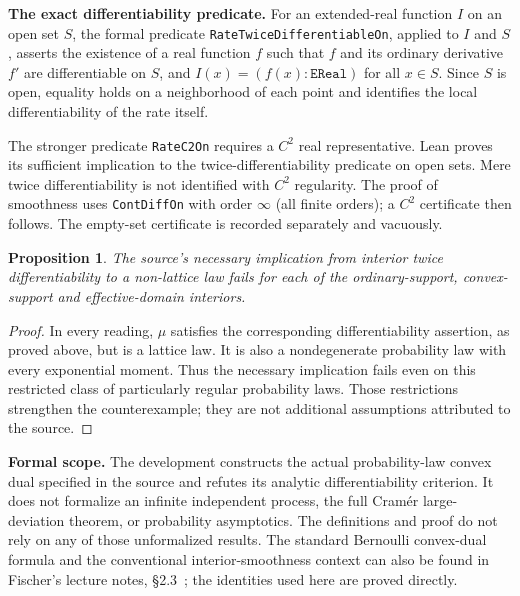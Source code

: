 \documentclass[11pt,a4paper]{article}
\newcommand{\code}[1]{\nolinkurl{#1}}
\newtheorem{proposition}{Proposition}
\begin{document}
\textbf{The exact differentiability predicate.}
For an extended-real function $I$ on an open set $S$, the formal predicate \code{RateTwiceDifferentiableOn}, applied to $I$ and $S$, asserts the existence of a real function $f$ such that $f$ and its ordinary derivative $f'$ are differentiable on $S$, and $I(x)=(f(x):\texttt{EReal})$ for all $x\in S$. Since $S$ is open, equality holds on a neighborhood of each point and identifies the local differentiability of the rate itself.

The stronger predicate \code{RateC2On} requires a $C^2$ real representative. Lean proves its sufficient implication to the twice-differentiability predicate on open sets. Mere twice differentiability is not identified with $C^2$ regularity. The proof of smoothness uses \code{ContDiffOn} with order $\infty$ (all finite orders); a $C^2$ certificate then follows. The empty-set certificate is recorded separately and vacuously.

\begin{proposition}
The source's necessary implication from interior twice differentiability to a non-lattice law fails for each of the ordinary-support, convex-support and effective-domain interiors.
\end{proposition}
\begin{proof}
In every reading, $\mu$ satisfies the corresponding differentiability assertion, as proved above, but is a lattice law. It is also a nondegenerate probability law with every exponential moment. Thus the necessary implication fails even on this restricted class of particularly regular probability laws. Those restrictions strengthen the counterexample; they are not additional assumptions attributed to the source.
\end{proof}

\textbf{Formal scope.}
The development constructs the actual probability-law convex dual specified in the source and refutes its analytic differentiability criterion. It does not formalize an infinite independent process, the full Cram\'er large-deviation theorem, or probability asymptotics. The definitions and proof do not rely on any of those unformalized results. The standard Bernoulli convex-dual formula and the conventional interior-smoothness context can also be found in Fischer's lecture notes, \S2.3~\cite{fischer}; the identities used here are proved directly.
\end{document}
